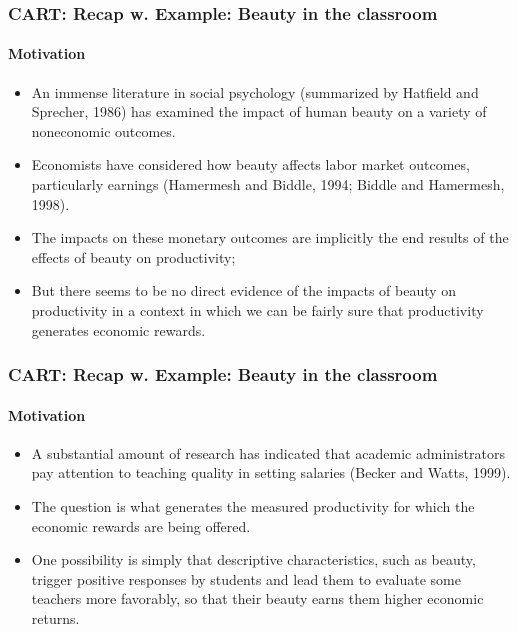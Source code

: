 \documentclass[
  shownotes,
  xcolor={svgnames},
  hyperref={colorlinks,citecolor=DarkBlue,linkcolor=DarkRed,urlcolor=DarkBlue}
  , aspectratio=169]{beamer}
\begin{document}
\begin{frame}[fragile]
\frametitle{CART: Recap w. Example: Beauty in the classroom}
\framesubtitle{Motivation}

\begin{itemize}
\item An immense literature in social psychology (summarized by Hatfield and Sprecher, 1986) has  examined  the  impact  of  human  beauty  on  a  variety  of  noneconomic  outcomes.   
\medskip
\item Economists have considered how beauty affects labor market outcomes, particularly earnings (Hamermesh  and  Biddle,  1994;  Biddle  and  Hamermesh,  1998).   
\medskip
\item  The  impacts  on  these  monetary  outcomes are implicitly the end results of the effects of beauty on productivity; 

\item But there seems to be  no  direct  evidence  of  the  impacts  of  beauty  on  productivity  in  a  context  in  which  we  can  be  fairly sure that productivity generates economic rewards. 


\end{itemize}

\end{frame}

\begin{frame}[fragile]
\frametitle{CART: Recap w. Example: Beauty in the classroom}
\framesubtitle{Motivation}


\begin{itemize}
  \item A substantial amount of research has indicated that academic administrators pay attention to teaching quality in setting salaries (Becker and Watts, 1999). 
  \medskip
  \item  The question  is  what  generates  the  measured  productivity  for  which  the  economic  rewards  are  being  offered.  
  \medskip
\item One possibility is simply that descriptive characteristics, such as beauty, trigger positive responses  by  students  and  lead  them  to  evaluate  some  teachers  more  favorably,  so  that  their  beauty earns them higher economic returns. 


\end{itemize}

\end{frame}
\end{document}
